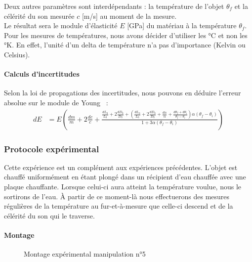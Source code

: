 Deux autres paramètres sont interdépendants : la température de l'objet
$\theta_f$ et la célérité du son mesurée $c$ [m/s] au moment de la
mesure.\\

Le résultat sera le module d'élasticité $E$ [GPa] du matériau à la
température $\theta_f$.\\

Pour les mesures de températures, nous avons décider d'utiliser les °C et
non les °K. En effet, l'unité d'un delta de température n'a pas
d'importance (Kelvin ou Celsius).
\paragraph{Calculs d'incertitudes}
    Selon la loi de propagations des incertitudes, nous pouvons en déduire
    l'erreur absolue sur le module de Young~\cite{gravier-laurent} :
    \begin{align}
    dE &= E \left(\frac{dm}{m}+2\frac{dc}{c}+\frac{\frac{dL_0}{L_0}+
    2\frac{dD_0}{D_0}+\left(\frac{dL_0}{L_0}+2\frac{dD_0}{D_0}+\frac{d
    \alpha}{\alpha}+\frac{d\theta_f+d\theta_i}{\theta_f-\theta_i}\right)
    \alpha(\theta_f-\theta_i)}{1+3\alpha (\theta_f-\theta_i)}\right)
    \end{align}
\subsubsection{\large Protocole expérimental}
    Cette expérience est un complément aux expériences précédentes. L'objet est
    chauffé uniformément en étant plongé dans un récipient d'eau
    chauffée avec une plaque chauffante. Lorsque celui-ci aura atteint la
    température voulue, nous le sortirons de l'eau. À partir de ce
    moment-là nous effectuerons des mesures régulières de la température
    au fur-et-à-mesure que celle-ci descend et de la célérité du son qui
    le traverse. 
\paragraph{Montage}

\begin{figure}[h]
    \centering
    \caption{Montage expérimental manipulation n°5}
\end{figure}
\newpage
